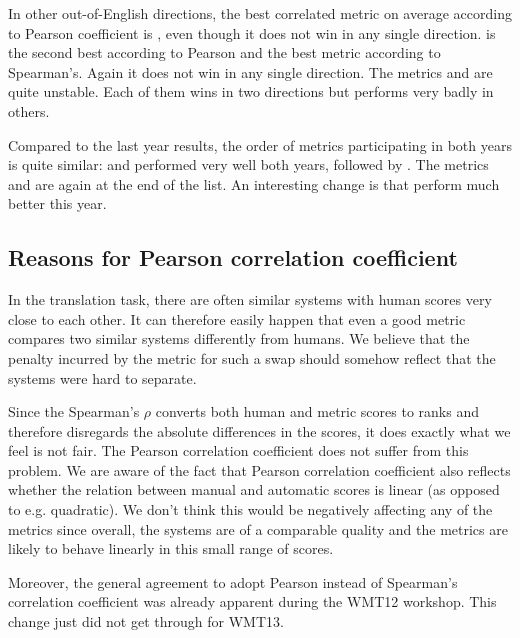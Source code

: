 In other out-of-English directions, the best correlated metric on average according
to Pearson coefficient is , even though it does not win in any
single direction.  is the second best according to Pearson
and the best metric according to Spearman's. Again it does not win in any
single direction. The metrics  and  are quite
unstable.  Each of them wins in two directions but performs very badly in
others.

Compared to the last year results, the order of metrics participating in both
years is quite similar:  and  performed very well
both years, followed by . The metrics  and 
are again at the end of the list. An interesting change is that
 perform much better this year.

\subsection{Reasons for Pearson correlation coefficient}

In the translation task, there are often similar systems with human scores very
close to each other. It can therefore easily happen that even a good metric
compares two similar systems differently from humans. We believe that the
penalty incurred by the metric for such a swap should somehow reflect that the
systems were hard to separate.

Since the Spearman's $\rho$ converts both human and metric scores to ranks and
therefore disregards the absolute differences in the scores, it does exactly what
we feel is not fair. The Pearson correlation coefficient does not suffer from this 
problem. We are aware of the fact that Pearson correlation coefficient also
reflects whether the relation between manual and automatic scores is linear (as
opposed to e.g. quadratic). We don't think this would be negatively affecting
any of the metrics since overall, the systems are of a comparable quality and
the metrics are likely to behave linearly in this small
range of scores.


Moreover, the general agreement to adopt Pearson instead of Spearman's correlation
coefficient was
already apparent during the WMT12 workshop. This change just did not get
through for WMT13.


